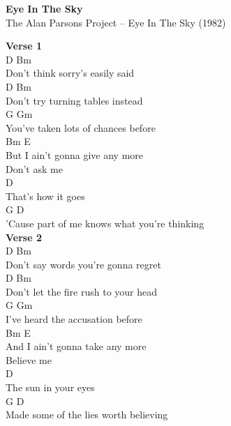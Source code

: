 \documentclass[a4paper]{article}
\begin{document}
    \begin{center}
        \textbf{Eye In The Sky}
        ~\\
        The Alan Parsons Project -- Eye In The Sky (1982)
    \end{center}
    {
        \scriptsize
        \textbf{Verse 1}
        ~\\
        {
            \cutive
            \obeyspaces
D                          Bm
\\
Don't think sorry's easily said
\\
D                          Bm
\\
Don't try turning tables instead
\\
       G                       Gm
\\
You've taken lots of chances before
\\
    Bm                     E
\\
But I ain't gonna give any more
\\
Don't ask me
\\
D
\\
That's how it goes
\\
       G                            D
\\
'Cause part of me knows what you're thinking
\\

        }
        \textbf{Verse 2}
        ~\\
        {
            \cutive
            \obeyspaces
D                              Bm
\\
Don't say words you're gonna regret
\\
D                               Bm
\\
Don't let the fire rush to your head
\\
     G                      Gm
\\
I've heard the accusation before
\\
    Bm                     E
\\
And I ain't gonna take any more
\\
Believe me
\\
    D
\\
The sun in your eyes
\\
     G                        D
\\
Made some of the lies worth believing
\\

}}
\end{document}
